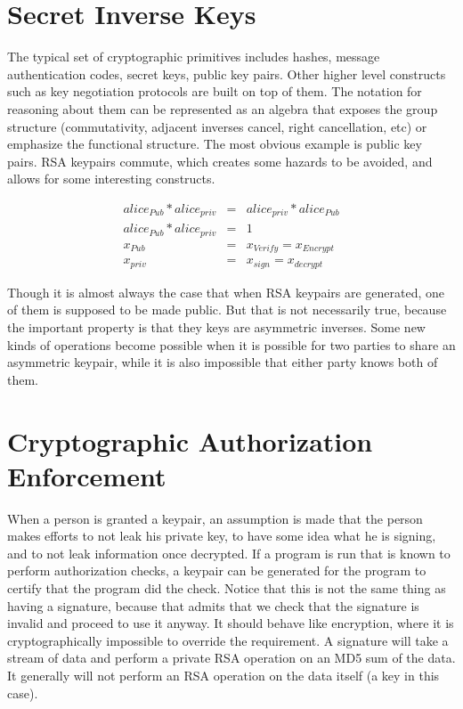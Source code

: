 \documentclass{article}
\begin{document}
\section{Secret Inverse Keys}

The typical set of cryptographic primitives includes hashes, message authentication codes, secret keys, public key pairs.  Other higher level constructs such as key negotiation protocols are built on top of them.  The notation for reasoning about them can be represented as an algebra that exposes the group structure (commutativity, adjacent inverses cancel, right cancellation, etc) or emphasize the functional structure.  The most obvious example is public key pairs. RSA keypairs commute, which creates some hazards to be avoided, and allows for some interesting constructs.

\begin{eqnarray}
	alice_{Pub} * alice_{priv} &=& alice_{priv} * alice_{Pub} \\
	alice_{Pub} * alice_{priv} &=& 1 \\
	x_{Pub} &=& x_{Verify} = x_{Encrypt} \\
	x_{priv} &=& x_{sign} = x_{decrypt}
\end{eqnarray}

Though it is almost always the case that when RSA keypairs are generated, one of them is supposed to be made public.  But that is not necessarily true, because the important property is that they keys are asymmetric inverses.  Some new kinds of operations become possible when it is possible for two parties to share an asymmetric keypair, while it is also impossible that either party knows both of them.

\section{Cryptographic Authorization Enforcement}

When a person is granted a keypair, an assumption is made that the person makes efforts to not leak his private key, to have some idea what he is signing, and to not leak information once decrypted.  If a program is run that is known to perform authorization checks, a keypair can be generated for the program to certify that the program did the check.  Notice that this is not the same thing as having a signature, because that admits that we check that the signature is invalid and proceed to use it anyway.  It should behave like encryption, where it is cryptographically impossible to override the requirement.  A signature will take a stream of data and perform a private RSA operation on an MD5 sum of the data.  It generally will not perform an RSA operation on the data itself (a key in this case).  
\end{document}
